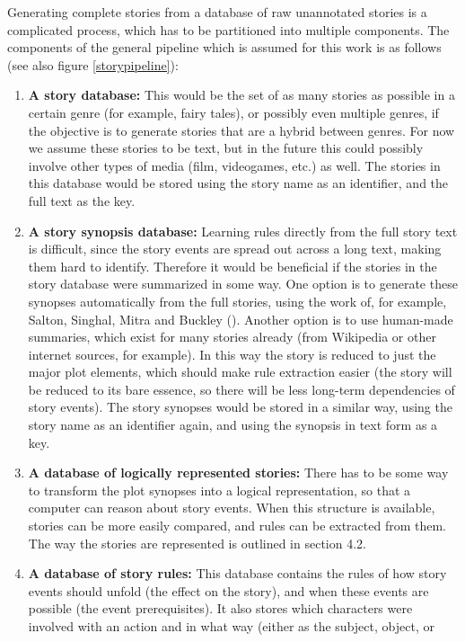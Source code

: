 Generating complete stories from a database of raw unannotated stories is a
complicated process, which has to be partitioned into multiple components.
The components of the general pipeline which is assumed for this work is as
follows (see also figure \ref{storypipeline}):
\begin{enumerate}
\item \textbf{A story database:} This would be the set of as many stories
as possible in a certain genre (for example, fairy tales), or possibly even
multiple genres, if the objective is to generate stories that are a hybrid
between genres. For now we assume these stories to be text, but in the future
this could possibly involve other types of media (film, videogames, etc.) as
well. The stories in this database would be stored using the story name as an
identifier, and the full text as the key.
\item \textbf{A story synopsis database:} Learning rules directly from the full
story text is difficult, since the story events are spread out across a long
text, making them hard to identify. Therefore it would be beneficial if the
stories in the story database were summarized in some way. One option is to generate these synopses
automatically from the full stories, using the work of, for example, Salton,
Singhal, Mitra and Buckley (\cite{salton1997automatic}). Another
option is to use human-made summaries, which exist for many stories already
(from Wikipedia or other internet sources, for example). In this way the story
is reduced to just the major plot elements, which should make rule extraction
easier (the story will be reduced to its bare essence, so there will be less 
long-term dependencies of story events). The story synopses would be stored in a
similar way, using the story name as an identifier again, and using the
synopsis in text form as a key.
\item \textbf{A database of logically represented stories:} There has to be some
way to transform the plot synopses into a logical representation, so that a
computer can reason about story events. When this
structure is available, stories can be more easily compared, and rules can be
extracted from them. The way the stories are represented is outlined in section
4.2.
\item \textbf{A database of story rules:} This database contains the rules of
how story events should unfold (the effect on the story), and when these events
are possible (the event prerequisites). It also stores which characters were
involved with an action and in what way (either as the subject, object, or

\end{enumerate}
